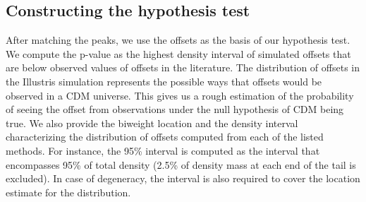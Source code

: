 \subsection{Constructing the hypothesis test} 

After matching the peaks, we use the offsets as the basis of our 
 hypothesis test. 
We compute the p-value as the highest density interval of simulated offsets 
that are below observed values of 
offsets in the literature. The distribution of offsets in the Illustris
simulation represents the possible ways that offsets would be observed in a CDM
universe.
This gives us a rough estimation of the probability 
of seeing the offset from observations under the null hypothesis of CDM 
being true. We also provide the biweight location and the density interval 
characterizing the 
distribution of offsets computed from each of the listed methods.
For instance, the 95\% interval is computed as the interval that encompasses
95\% of total density (2.5\% of density mass at each end of the tail is
excluded). In case of degeneracy, the interval is also required to cover the 
location estimate for the distribution.

